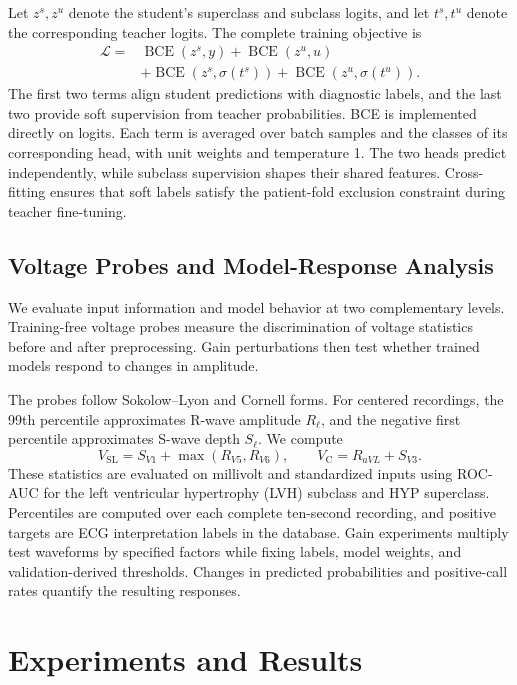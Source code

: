 \documentclass[11pt,a4paper]{article}
\begin{document}
Let $z^s,z^u$ denote the student's superclass and subclass logits, and let $t^s,t^u$ denote the corresponding teacher logits. The complete training objective is
\begin{align}
 \mathcal L={}&\operatorname{BCE}(z^s,y)+\operatorname{BCE}(z^u,u)\nonumber\\
 &+\operatorname{BCE}(z^s,\sigma(t^s))+\operatorname{BCE}(z^u,\sigma(t^u)).
\end{align}
The first two terms align student predictions with diagnostic labels, and the last two provide soft supervision from teacher probabilities\cite{hinton2015}. BCE is implemented directly on logits. Each term is averaged over batch samples and the classes of its corresponding head, with unit weights and temperature 1. The two heads predict independently, while subclass supervision shapes their shared features. Cross-fitting ensures that soft labels satisfy the patient-fold exclusion constraint during teacher fine-tuning.

\subsection{Voltage Probes and Model-Response Analysis}
We evaluate input information and model behavior at two complementary levels. Training-free voltage probes measure the discrimination of voltage statistics before and after preprocessing. Gain perturbations then test whether trained models respond to changes in amplitude.

The probes follow Sokolow--Lyon and Cornell forms\cite{sokolow1949,casale1985}. For centered recordings, the 99th percentile approximates R-wave amplitude $R_\ell$, and the negative first percentile approximates S-wave depth $S_\ell$. We compute
\begin{equation}
 V_{\mathrm{SL}}=S_{V1}+\max(R_{V5},R_{V6}),\qquad
 V_{\mathrm C}=R_{aVL}+S_{V3}.
\end{equation}
These statistics are evaluated on millivolt and standardized inputs using ROC-AUC for the left ventricular hypertrophy (LVH) subclass and HYP superclass. Percentiles are computed over each complete ten-second recording, and positive targets are ECG interpretation labels in the database. Gain experiments multiply test waveforms by specified factors while fixing labels, model weights, and validation-derived thresholds. Changes in predicted probabilities and positive-call rates quantify the resulting responses.

\section{Experiments and Results}
\end{document}
